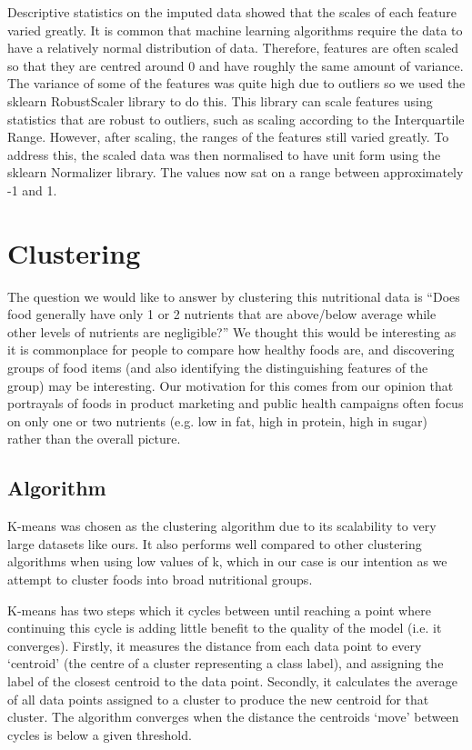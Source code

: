\documentclass[journal]{IEEEtran}
\begin{document}
Descriptive statistics on the imputed data showed that the scales of each feature varied greatly. It is common that machine learning algorithms require the data to have a relatively normal distribution of data. Therefore, features are often scaled so that they are centred around 0 and have roughly the same amount of variance. The variance of some of the features was quite high due to outliers so we used the sklearn RobustScaler library to do this. This library can scale features using statistics that are robust to outliers, such as scaling according to the Interquartile Range. However, after scaling, the ranges of the features still varied greatly. To address this, the scaled data was then normalised to have unit form using the sklearn Normalizer library. The values now sat on a range between approximately -1 and 1.


\section{Clustering}

The question we would like to answer by clustering this nutritional data is “Does food generally have only 1 or 2 nutrients that are above/below average while other levels of nutrients are negligible?” We thought this would be interesting as it is commonplace for people to compare how healthy foods are, and discovering groups of food items (and also identifying the distinguishing features of the group) may be interesting. Our motivation for this comes from our opinion that portrayals of foods in product marketing and public health campaigns often focus on only one or two nutrients (e.g. low in fat, high in protein, high in sugar) rather than the overall picture.

\subsection{Algorithm}
K-means was chosen as the clustering algorithm due to its scalability to very large datasets like ours. It also performs well compared to other clustering algorithms when using low values of k, which in our case is our intention as we attempt to cluster foods into broad nutritional groups.

K-means has two steps which it cycles between until reaching a point where continuing this cycle is adding little benefit to the quality of the model (i.e. it converges). Firstly, it measures the distance from each data point to every ‘centroid’ (the centre of a cluster representing a class label), and assigning the label of the closest centroid to the data point. Secondly, it calculates the average of all data points assigned to a cluster to produce the new centroid for that cluster. The algorithm converges when the distance the centroids ‘move’ between cycles is below a given threshold.
\end{document}
